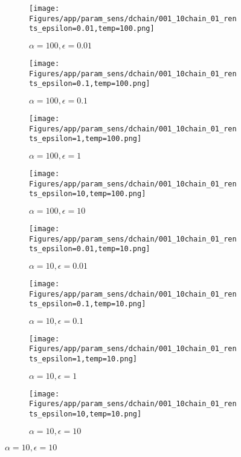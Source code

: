 \documentclass{article}
\theoremstyle{plain}
\begin{document}
\begin{appendices}
\begin{figure}
                \begin{subfigure}[b]{0.24\textwidth}
                    \centering
                    \texttt{[image: Figures/app/param\_sens/dchain/001\_10chain\_01\_rents\_epsilon=0.01,temp=100.png]}
                    \caption*{$\alpha=100,\epsilon=0.01$}
                \end{subfigure}
                \begin{subfigure}[b]{0.24\textwidth}
                    \centering
                    \texttt{[image: Figures/app/param\_sens/dchain/001\_10chain\_01\_rents\_epsilon=0.1,temp=100.png]}
                    \caption*{$\alpha=100,\epsilon=0.1$}
                \end{subfigure}
                \begin{subfigure}[b]{0.24\textwidth}
                    \centering
                    \texttt{[image: Figures/app/param\_sens/dchain/001\_10chain\_01\_rents\_epsilon=1,temp=100.png]}
                    \caption*{$\alpha=100,\epsilon=1$}
                \end{subfigure}
                \begin{subfigure}[b]{0.24\textwidth}
                    \centering
                    \texttt{[image: Figures/app/param\_sens/dchain/001\_10chain\_01\_rents\_epsilon=10,temp=100.png]}
                    \caption*{$\alpha=100,\epsilon=10$}
                \end{subfigure}
                
                \begin{subfigure}[b]{0.24\textwidth}
                    \centering
                    \texttt{[image: Figures/app/param\_sens/dchain/001\_10chain\_01\_rents\_epsilon=0.01,temp=10.png]}
                    \caption*{$\alpha=10,\epsilon=0.01$}
                \end{subfigure}
                \begin{subfigure}[b]{0.24\textwidth}
                    \centering
                    \texttt{[image: Figures/app/param\_sens/dchain/001\_10chain\_01\_rents\_epsilon=0.1,temp=10.png]}
                    \caption*{$\alpha=10,\epsilon=0.1$}
                \end{subfigure}
                \begin{subfigure}[b]{0.24\textwidth}
                    \centering
                    \texttt{[image: Figures/app/param\_sens/dchain/001\_10chain\_01\_rents\_epsilon=1,temp=10.png]}
                    \caption*{$\alpha=10,\epsilon=1$}
                \end{subfigure}
                \begin{subfigure}[b]{0.24\textwidth}
                    \centering
                    \texttt{[image: Figures/app/param\_sens/dchain/001\_10chain\_01\_rents\_epsilon=10,temp=10.png]}
                    \caption*{$\alpha=10,\epsilon=10$}
                \end{subfigure}
                

\end{figure}
\end{appendices}
\end{document}
